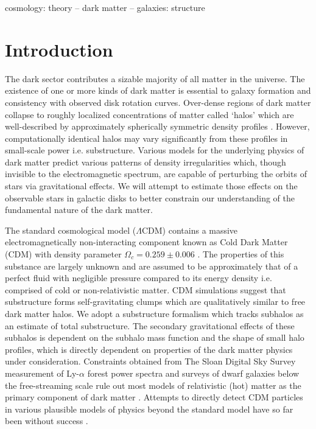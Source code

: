 \documentclass[usenatbib]{mnras}
\newcommand{\lcdm}{$\Lambda$CDM}
\begin{document}
\begin{keywords}
cosmology: theory -- dark matter -- galaxies: structure
\end{keywords}

\section{Introduction}
\hspace{5mm} 
The dark sector contributes a sizable majority of all matter in the universe. The existence of one or more kinds of dark matter is essential to galaxy formation and consistency with observed disk rotation curves. Over-dense regions of dark matter collapse to roughly localized concentrations of matter called ‘halos’ which are well-described by approximately spherically symmetric density profiles \citep{structure}. However, computationally identical halos may vary significantly from these profiles in small-scale power i.e. substructure. Various models for the underlying physics of dark matter predict various patterns of density irregularities which, though invisible to the electromagnetic spectrum, are capable of perturbing the orbits of stars via gravitational effects. We will attempt to estimate those effects on the observable stars in galactic disks to better constrain our understanding of the fundamental nature of the dark matter.             
\par 
	The standard cosmological model (\lcdm) contains a massive electromagnetically non-interacting component known as Cold Dark Matter (CDM) with density parameter $\Omega_c = 0.259 \pm 0.006$ \citep{planck}. The properties of this substance are largely unknown and are assumed to be approximately that of a perfect fluid with negligible pressure compared to its energy density i.e. comprised of cold or non-relativistic matter. CDM simulations suggest that substructure forms self-gravitating clumps which are qualitatively similar to free dark matter halos. We adopt a substructure formalism which tracks subhalos as an estimate of total substructure. The secondary gravitational effects of these subhalos is dependent on the subhalo mass function and the shape of small halo profiles, which is directly dependent on properties of the dark matter physics under consideration. Constraints obtained from The Sloan Digital Sky Survey measurement of Ly-$\alpha$ forest power spectra and surveys of dwarf galaxies below the free-streaming scale rule out most models of relativistic (hot) matter as the primary component of dark matter \citep{can_neutrinos}. Attempts to directly detect CDM particles in various plausible models of physics beyond the standard model have so far been without success \citep{direct_detection}.  
\end{document}
